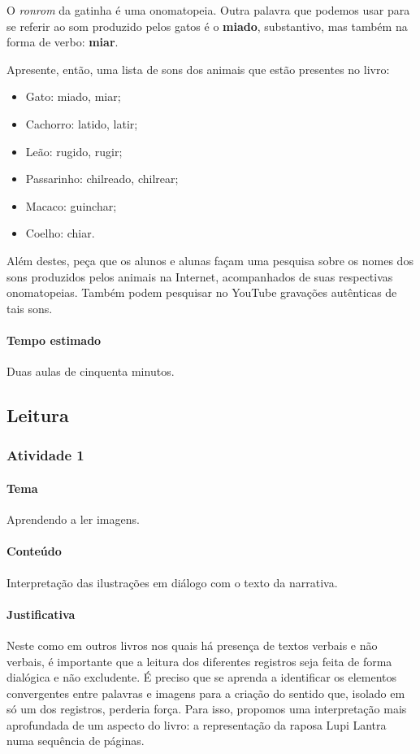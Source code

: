 \documentclass[11pt]{extarticle}
\begin{document}
O \textit{ronrom} da gatinha é uma onomatopeia. Outra palavra que podemos usar
para se referir ao som produzido pelos gatos é o \textbf{miado}, substantivo,
mas também na forma de verbo: \textbf{miar}.

Apresente, então, uma lista de sons dos animais que estão presentes 
no livro:

\begin{itemize}
	\item Gato: miado, miar;
	\item Cachorro: latido, latir;
	\item Leão: rugido, rugir;
	\item Passarinho: chilreado, chilrear;
	\item Macaco: guinchar;
	\item Coelho: chiar.
\end{itemize}

Além destes, peça que os alunos e alunas façam uma pesquisa sobre os nomes dos sons
produzidos pelos animais na Internet, acompanhados de suas respectivas onomatopeias.
Também podem pesquisar no YouTube gravações autênticas de tais sons. 


\paragraph{Tempo estimado} Duas aulas de cinquenta minutos.


\subsection{Leitura}


\subsubsection{Atividade 1}

\paragraph{Tema} Aprendendo a ler imagens. 

\paragraph{Conteúdo} Interpretação das ilustrações em diálogo com o texto 
da narrativa.

\paragraph{Justificativa} Neste como em outros livros nos quais há presença
de textos verbais e não verbais, é importante que a leitura dos diferentes 
registros seja feita de forma dialógica e não excludente. É preciso
que se aprenda a identificar os elementos convergentes entre palavras e 
imagens para a criação do sentido que, isolado em só um dos registros, perderia
força. Para isso, propomos uma interpretação mais aprofundada de um 
aspecto do livro: a representação da raposa Lupi Lantra numa sequência
de páginas. 
\end{document}
